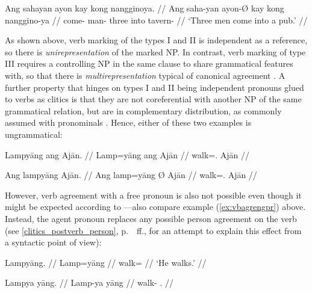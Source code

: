 \ex\label{ex:verbplagr} %
\begingl
	\gla Ang sahayan ayon kay kong nangginoya. //
	\glb Ang saha-yan ayon-Ø kay kong nanggino-ya //
	\glc \AgtT{} come-\TplM{} man-\Top{} three into tavern-\Loc{} //
	\glft `Three men come into a pub.' //
\endgl\xe

As shown above, verb marking of the types I and II is independent as a
reference, so there is \emph{unirepresentation} of the marked NP. In contrast,
verb marking of type III requires a controlling NP in the same clause to share
grammatical features with, so that there is \emph{multirepresentation} typical
of canonical agreement \citep[106]{corbett2006}.
A further property that hinges on types I and II
being independent pronouns glued to verbs as clitics is that they are not
coreferential with another NP of the same grammatical relation, but are in
complementary distribution, as commonly assumed with pronominals
\citep[108]{corbett2006}. Hence, either of these two examples is ungrammatical:

\pex %
\a\ljudge* \begingl
	\gla Lampyāng ang Ajān. //
	\glb Lamp=yāng ang ​Ajān //
	\glc walk=\TsgM{}.\Aarg{} \Aarg{} Ajān //
\endgl

\a\ljudge* \begingl	
	\gla Ang lampyāng {} Ajān. //
	\glb Ang lamp=yāng Ø ​Ajān //
	\glc \AgtT{} walk=\TsgM{}.\Aarg{} \Top{} ​Ajān //
\endgl

\xe

However, verb agreement with a free pronoun is also not possible even though
it might be expected according to \citep[109]{corbett2006}---also compare
example (\ref{ex:vbagrengpr}) above. Instead, the agent pronoun replaces any
possible person agreement on the verb (see \autoref{clitics_postverb_person},
p.~\pageref{clitics_postverb_person}~ff., for an attempt to explain this effect
from a syntactic point of view):

\pex %
\a\begingl
	\gla Lampyāng. //
	\glb Lamp=yāng //
	\glc walk=\TsgM{} //
	\glft `He walks.' //
\endgl

\a\ljudge* \begingl	
	\gla Lampya yāng. //
	\glb Lamp-ya yāng //
	\glc walk-\TsgM{} \TsgM{}.\Aarg{} //
\endgl

\xe

